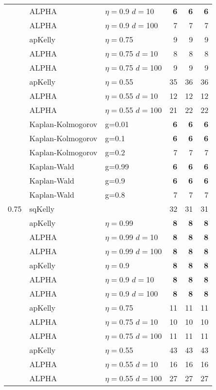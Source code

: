 \documentclass[12pt,runningheads]{llncs}
\begin{document}
{\begin{table}
\begin{tabular}{lll|rrr}
\cline{2-6}
& ALPHA & $\eta=$0.9 $d=$10 & \bf{6}  & \bf{6}  & \bf{6}  \\
& ALPHA & $\eta=$0.9 $d=$100 & 7  & 7  & 7  \\
\cline{2-6} & apKelly & $\eta=$0.75 & 9  & 9  & 9  \\
\cline{2-6}
& ALPHA & $\eta=$0.75 $d=$10 & 8  & 8  & 8  \\
& ALPHA & $\eta=$0.75 $d=$100 & 9  & 9  & 9  \\
\cline{2-6} & apKelly & $\eta=$0.55 & 35  & 36  & 36  \\
\cline{2-6}
& ALPHA & $\eta=$0.55 $d=$10 & 12  & 12  & 12  \\
& ALPHA & $\eta=$0.55 $d=$100 & 21  & 22  & 22  \\
\cline{2-6}
 & Kaplan-Kolmogorov & g=0.01 & \bf{6}  & \bf{6}  & \bf{6}  \\
 & Kaplan-Kolmogorov & g=0.1 & \bf{6}  & \bf{6}  & \bf{6}  \\
 & Kaplan-Kolmogorov & g=0.2 & 7  & 7  & 7  \\
\cline{2-6}
 & Kaplan-Wald & g=0.99 & \bf{6}  & \bf{6}  & \bf{6}  \\
 & Kaplan-Wald & g=0.9 & \bf{6}  & \bf{6}  & \bf{6}  \\
 & Kaplan-Wald & g=0.8 & 7  & 7  & 7  \\
\hline 0.75 & sqKelly & & 32  & 31  & 31  \\
\cline{2-6} & apKelly & $\eta=$0.99 & \bf{8}  & \bf{8}  & \bf{8}  \\
\cline{2-6}
& ALPHA & $\eta=$0.99 $d=$10 & \bf{8}  & \bf{8}  & \bf{8}  \\
& ALPHA & $\eta=$0.99 $d=$100 & \bf{8}  & \bf{8}  & \bf{8}  \\
\cline{2-6} & apKelly & $\eta=$0.9 & \bf{8}  & \bf{8}  & \bf{8}  \\
\cline{2-6}
& ALPHA & $\eta=$0.9 $d=$10 & \bf{8}  & \bf{8}  & \bf{8}  \\
& ALPHA & $\eta=$0.9 $d=$100 & \bf{8}  & \bf{8}  & \bf{8}  \\
\cline{2-6} & apKelly & $\eta=$0.75 & 11  & 11  & 11  \\
\cline{2-6}
& ALPHA & $\eta=$0.75 $d=$10 & 10  & 10  & 10  \\
& ALPHA & $\eta=$0.75 $d=$100 & 11  & 11  & 11  \\
\cline{2-6} & apKelly & $\eta=$0.55 & 43  & 43  & 43  \\
\cline{2-6}
& ALPHA & $\eta=$0.55 $d=$10 & 16  & 16  & 16  \\
& ALPHA & $\eta=$0.55 $d=$100 & 27  & 27  & 27  \\

\end{tabular}
\end{table}}
\end{document}

